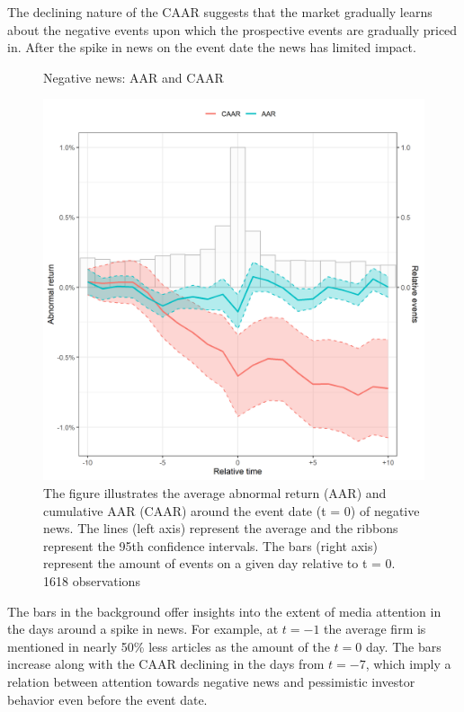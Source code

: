 The declining nature of the CAAR suggests that the market gradually learns about the negative events upon which the prospective events are gradually priced in. After the spike in news on the event date the news has limited impact. \\ 


\begin{figure} [H]
    \centering
    \caption{Negative news: AAR and CAAR}
    \includegraphics[scale=0.6]{Projekt/1.Figures analysis/ST_negative_all_CI.png}
     \caption*{\footnotesize The figure illustrates the average abnormal return (AAR) and cumulative AAR (CAAR) around the event date (t = 0) of negative news. The lines (left axis) represent the average and the ribbons represent the 95th confidence intervals. The bars (right axis) represent the amount of events on a given day relative to t = 0. 1618 observations }
    \label{fig:ST_neg_news}
\end{figure} 

 
The bars in the background offer insights into the extent of media attention in the days around a spike in news. For example, at $t = -1$ the average firm is mentioned in nearly 50\% less articles as the amount of the $t = 0$ day. The bars increase along with the CAAR declining in the days from $t=-7$, which imply a relation between attention towards negative news and pessimistic investor behavior even before the event date. 

